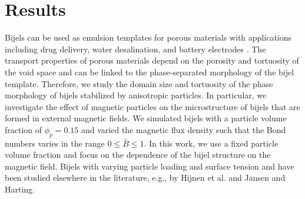 
\section{Results}\label{sec:results_p1}

Bijels can be used as emulsion templates for porous materials with
applications including drug delivery, water desalination, and battery
electrodes
\cite{vanoli_bijels_2022, chen_pore-scale_2022, lu_controllable_2020, garcia_scalable_2019}.
The transport properties of porous materials depend on the porosity and
tortuosity of the void space and can be linked to the phase-separated
morphology of the bijel template. Therefore, we study the domain size
and tortuosity of the phase morphology of bijels stabilized by
anisotropic particles. In particular, we investigate the effect of
magnetic particles on the microstructure of bijels that are formed in
external magnetic fields. We simulated bijels with a particle volume
fraction of \(\phi_p=0.15\) and varied the magnetic flux density such
that the Bond numbers varies in the range \(0\le\bar{B}\le1\).
In this work, we use a fixed particle volume fraction and focus on the dependence of the 
bijel structure on the magnetic field. Bijels with varying particle loading and surface tension 
and have been studied elsewhere in the literature, e.g., by Hijnen et al.\cite{hijnen_bijels_2015} 
and Jansen and Harting\cite{jansen_bijels_2011}.

